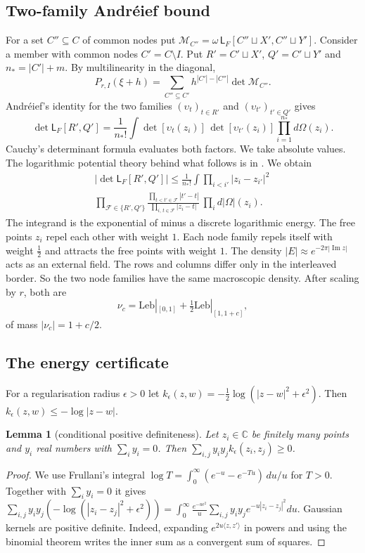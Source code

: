 \documentclass[11pt]{amsart}
\newtheorem{lemma}[theorem]{Lemma}
\theoremstyle{definition}
\theoremstyle{remark}
\numberwithin{equation}{section}
\newcommand{\C}{\mathbb C}
\renewcommand{\Im}{\operatorname{Im}}
\newcommand{\Lw}{\mathsf L}          %
\begin{document}
\subsection{Two-family Andr\'eief bound}
For a set $C''\subseteq C$ of common nodes put $\mathcal M_{C''}=\omega\,\Lw_F[C''\sqcup X',C''\sqcup Y']$. Consider a
member with common nodes $C'=C\setminus I$. Put $R'=C'\sqcup X'$, $Q'=C'\sqcup Y'$ and $n_*=|C'|+m$. By multilinearity in
the diagonal,
\begin{equation}\label{eq:expand}
 P_{r,I}(\xi+h)=\sum_{C''\subseteq C'}h^{|C'|-|C''|}\det\mathcal M_{C''} .
\end{equation}
Andr\'eief's identity \cite{Forrester2018Andreief} for the two families $(\upsilon_t)_{t\in R'}$ and
$(\upsilon_{t'})_{t'\in Q'}$ gives
\[
 \det\Lw_F[R',Q']=\frac1{n_*!}\int\det[\upsilon_t(z_i)]\,\det[\upsilon_{t'}(z_i)]\prod_{i=1}^{n_*}d\Omega(z_i).
\]
Cauchy's determinant formula evaluates both factors. We take absolute values. The logarithmic potential theory behind
what follows is in \cite{SaffTotik}. We obtain
\begin{multline*}
 |\det\Lw_F[R',Q']|\le\frac1{n_*!}\int\prod_{i<i'}|z_i-z_{i'}|^2\,\\
 \prod_{\mathcal F\in\{R',Q'\}}\frac{\prod_{t<t'\in\mathcal F}|t'-t|}{\prod_{i,\,t\in\mathcal F}|z_i-t|}\
 \prod_id|\Omega|(z_i).
\end{multline*}
The integrand is the exponential of minus a discrete logarithmic energy. The free points $z_i$ repel each other with
weight $1$. Each node family repels itself with weight $\frac12$ and attracts the free points with weight $1$. The
density $|E|\approx e^{-2\pi|\Im z|}$ acts as an external field. The rows and columns differ only in the interleaved
border. So the two node families have the same macroscopic density. After scaling by $r$, both are
\[
 \nu_c=\mathrm{Leb}|_{[0,1]}+\tfrac12\mathrm{Leb}|_{[1,1+c]},
\]
of mass $|\nu_c|=1+c/2$.

\subsection{The energy certificate}
For a regularisation radius $\epsilon>0$ let $k_\epsilon(z,w)=-\frac12\log(|z-w|^2+\epsilon^2)$. Then $k_\epsilon(z,w)\le-\log|z-w|$.

\begin{lemma}[conditional positive definiteness]\label{lem:cpd}
Let $z_i\in\C$ be finitely many points and $y_i$ real numbers with $\sum_iy_i=0$. Then
$\sum_{i,j}y_iy_jk_\epsilon(z_i,z_j)\ge0$.
\end{lemma}
\begin{proof}
We use Frullani's integral $\log T=\int_0^\infty(e^{-u}-e^{-Tu})\,du/u$ for $T>0$. Together with $\sum_iy_i=0$ it gives
$\sum_{i,j}y_iy_j(-\log(|z_i-z_j|^2+\epsilon^2))=\int_0^\infty\frac{e^{-u\epsilon^2}}u\sum_{i,j}y_iy_je^{-u|z_i-z_j|^2}du$.
Gaussian kernels are positive definite. Indeed, expanding $e^{2u\langle z,z'\rangle}$ in powers and using the binomial
theorem writes the inner sum as a convergent sum of squares.
\end{proof}
\end{document}
